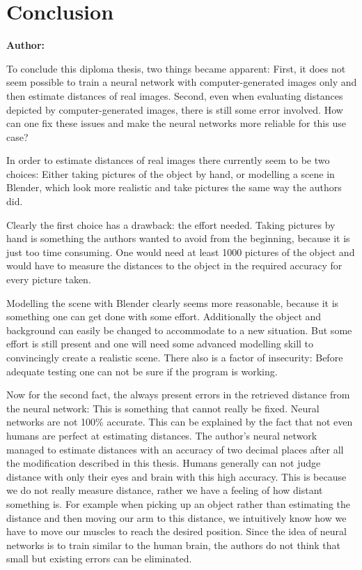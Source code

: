 \chapter{Conclusion}

\textbf{Author: } 

To conclude this diploma thesis, two things became apparent: First, it does not seem possible to train a neural network with computer-generated images only and then estimate distances of real images. Second, even when evaluating distances depicted by computer-generated images, there is still some error involved. How can one fix these issues and make the neural networks more reliable for this use case?

In order to estimate distances of real images there currently seem to be two choices: Either taking pictures of the object by hand, or modelling a scene in Blender, which look more realistic and take pictures the same way the authors did.

Clearly the first choice has a drawback: the effort needed. Taking pictures by hand is something the authors wanted to avoid from the beginning, because it is just too time consuming. One would need at least 1000 pictures of the object and would have to measure the distances to the object in the required accuracy for every picture taken.

Modelling the scene with Blender clearly seems more reasonable, because it is something one can get done with some effort. Additionally the object and background can easily be changed to accommodate to a new situation. But some effort is still present and one will need some advanced modelling skill to convincingly create a realistic scene. There also is a factor of insecurity: Before adequate testing one can not be sure if the program is working.

Now for the second fact, the always present errors in the retrieved distance from the neural network: This is something that cannot really be fixed. Neural networks are not 100\% accurate. This can be explained by the fact that not even humans are perfect at estimating distances. The author's neural network managed to estimate distances with an accuracy of two decimal places after all the modification described in this thesis. Humans generally can not judge distance with only their eyes and brain with this high accuracy. This is because we do not really measure distance, rather we have a feeling of how distant something is. For example when picking up an object rather than estimating the distance and then moving our arm to this distance, we intuitively know how we have to move our muscles to reach the desired position. Since the idea of neural networks is to train similar to the human brain, the authors do not think that small but existing errors can be eliminated. 

